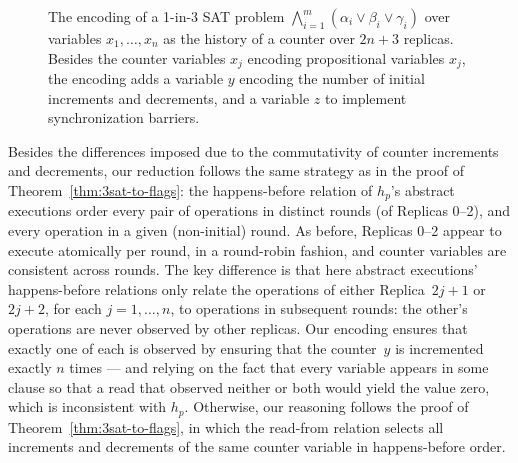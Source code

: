     \begin{figure}[t]
      \centering
      {\scriptsize}
     \vspace{-1mm}
      \caption{The encoding of a 1-in-3 SAT problem $\bigwedge_{i=1}^{m} (\alpha_i \lor \beta_i \lor \gamma_i)$ over variables $x_1, \ldots, x_n$ as the history of a counter over $2n+3$ replicas. Besides the counter variables $x_j$ encoding propositional variables $x_j$, the encoding adds a variable $y$ encoding the number of initial increments and decrements, and a variable $z$ to implement synchronization barriers.}
      \label{fig:3sat-to-counter}
     \vspace{-4mm}
    \end{figure}

     Besides the differences imposed due to the commutativity of counter increments and decrements, our reduction follows the same strategy as in the proof of Theorem~\ref{thm:3sat-to-flags}: the happens-before relation of $h_p$’s abstract executions order every pair of operations in distinct rounds (of Replicas 0–2), and every operation in a given (non-initial) round. As before, Replicas 0–2 appear to execute atomically per round, in a round-robin fashion, and counter variables are consistent across rounds. The key difference is that here abstract executions’ happens-before relations only relate the operations of either Replica~$2j\!+\!1$ or $2j\!+\!2$, for each $j = 1, \ldots, n$, to operations in subsequent rounds: the other’s operations are never observed by other replicas. Our encoding ensures that exactly one of each is observed by ensuring that the counter~$y$ is incremented exactly $n$ times — and relying on the fact that every variable appears in some clause so that a read that observed neither or both would yield the value zero, which is inconsistent with $h_p$. Otherwise, our reasoning follows the proof of Theorem~\ref{thm:3sat-to-flags}, in which the read-from relation selects all increments and decrements of the same counter variable in happens-before order.
\vspace{-2mm}



